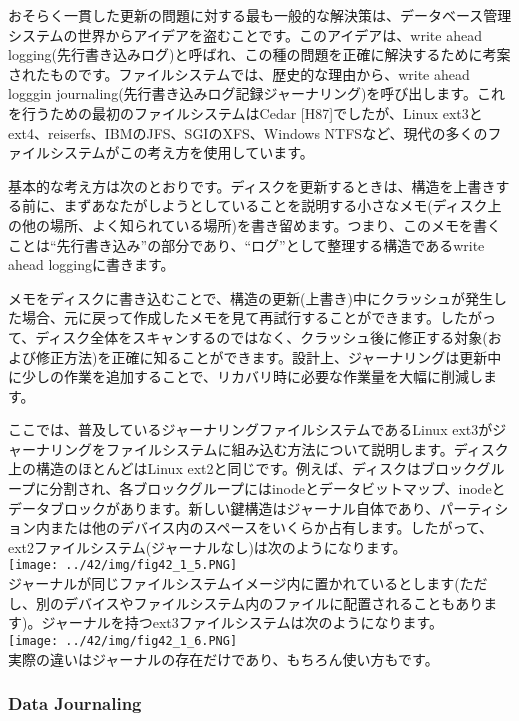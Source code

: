 おそらく一貫した更新の問題に対する最も一般的な解決策は、データベース管理システムの世界からアイデアを盗むことです。このアイデアは、write
ahead
logging(先行書き込みログ)と呼ばれ、この種の問題を正確に解決するために考案されたものです。ファイルシステムでは、歴史的な理由から、write
ahead logggin
journaling(先行書き込みログ記録ジャーナリング)を呼び出します。これを行うための最初のファイルシステムはCedar
{[}H87{]}でしたが、Linux
ext3とext4、reiserfs、IBMのJFS、SGIのXFS、Windows
NTFSなど、現代の多くのファイルシステムがこの考え方を使用しています。

基本的な考え方は次のとおりです。ディスクを更新するときは、構造を上書きする前に、まずあなたがしようとしていることを説明する小さなメモ(ディスク上の他の場所、よく知られている場所)を書き留めます。つまり、このメモを書くことは``先行書き込み''の部分であり、``ログ''として整理する構造であるwrite
ahead loggingに書きます。

メモをディスクに書き込むことで、構造の更新(上書き)中にクラッシュが発生した場合、元に戻って作成したメモを見て再試行することができます。したがって、ディスク全体をスキャンするのではなく、クラッシュ後に修正する対象(および修正方法)を正確に知ることができます。設計上、ジャーナリングは更新中に少しの作業を追加することで、リカバリ時に必要な作業量を大幅に削減します。

ここでは、普及しているジャーナリングファイルシステムであるLinux
ext3がジャーナリングをファイルシステムに組み込む方法について説明します。ディスク上の構造のほとんどはLinux
ext2と同じです。例えば、ディスクはブロックグループに分割され、各ブロックグループにはinodeとデータビットマップ、inodeとデータブロックがあります。新しい鍵構造はジャーナル自体であり、パーティション内または他のデバイス内のスペースをいくらか占有します。したがって、ext2ファイルシステム(ジャーナルなし)は次のようになります。\\
\texttt{[image: ../42/img/fig42\_1\_5.PNG]}\\
ジャーナルが同じファイルシステムイメージ内に置かれているとします(ただし、別のデバイスやファイルシステム内のファイルに配置されることもあります)。ジャーナルを持つext3ファイルシステムは次のようになります。\\
\texttt{[image: ../42/img/fig42\_1\_6.PNG]}\\
実際の違いはジャーナルの存在だけであり、もちろん使い方もです。

\hypertarget{data-journaling}{%
\subsubsection*{Data Journaling}\label{data-journaling}}


